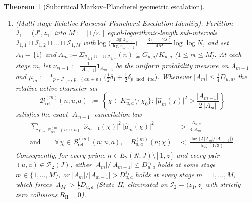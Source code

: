 \documentclass[11pt, a4paper]{article}
\theoremstyle{plain}
\newtheorem{theorem}{Theorem}[section]
\theoremstyle{definition}
\begin{document}
\begin{theorem}[Subcritical Markov--Plancherel geometric escalation]
\begin{enumerate}[label=(\alph*)]
    \item \emph{(Multi-stage Relative Parseval--Plancherel Escalation Identity).} 
    Partition $\mathcal{I}_1=(J^{5},z_1]$ into $M:=\lceil 1/\varepsilon_1\rceil$ equal-logarithmic-length sub-intervals $\mathcal{I}_{1,1}\sqcup\mathcal{I}_{1,2}\sqcup\dots\sqcup\mathcal{I}_{1,M}$ with\linebreak $\log\big(\frac{\log z_{1,m}}{\log z_{1,m-1}}\big)=\frac{3(1-2\lambda)}{4M}\log\log N$, and set $A_0=\{1\}$ and $A_m:=$\linebreak $\overline{\Sigma}_{\mathcal{I}_{1,1}\cup\dots\cup\mathcal{I}_{1,m}}(n)\subseteq G_{u,a}/K_{u,a}$ ($1\le m\le M$). At each stage $m$, let $\nu_{m-1}:=\frac{1}{|A_{m-1}|}\mathbf{1}_{A_{m-1}}$ be the uniform probability measure on $A_{m-1}$ and $\mu_m:=\ast_{p\in\mathcal{I}_{1,m},\,p\mid(an+u)}\big(\frac12\delta_1+\frac12\delta_{p\bmod 4ua}\big)$. Whenever $|A_m|\le\frac14 D_{u,a}$, the relative active character set
    \begin{equation}\label{eq:relative_active_char_set}
    \mathcal{B}_{\mathrm{rel}}^{(m)}(n;u,a)\ :=\ \left\{\chi\in K_{u,a}^{\perp}\setminus\{\chi_0\}:\ \big|\widehat{\mu}_m(\chi)\big|^{2}>\frac{|A_{m-1}|}{2\,|A_m|}\right\}
    \end{equation}
    satisfies the exact $|A_{m-1}|$-cancellation law
    \begin{equation}\label{eq:relative_parseval_plancherel_law}
    \begin{aligned}
    \sum_{\chi\in\mathcal{B}_{\mathrm{rel}}^{(m)}(n;u,a)}\big|\widehat{\nu}_{m-1}(\chi)\big|^{2}\,\big|\widehat{\mu}_m(\chi)\big|^{2}\ &>\ \frac{D_{u,a}}{4\,|A_m|}\\
    \text{and}\qquad\forall\,\chi\in\mathcal{B}_{\mathrm{rel}}^{(m)}(n;u,a),\quad R_{u,a}^{(m)}(n;\chi)\ &<\ \frac{\log\big(2\,|A_m|/|A_{m-1}|\big)}{\log(4/3)}.
    \end{aligned}
    \end{equation}
    Consequently, for every prime $n\in E_2(N;J)\setminus[1,z]$ and every pair $(u,a)\in\mathcal{P}_2(J)$, either $|A_m|/|A_{m-1}|\le D_{u,a}^{\varepsilon_1}$ holds at some stage $m\in\{1,\dots,M\}$, or $|A_m|/|A_{m-1}|>D_{u,a}^{\varepsilon_1}$ holds at every stage $m=1,\dots,M$, which forces $|A_M|>\frac14 D_{u,a}$ (State~II, eliminated on $\mathcal{I}_2=(z_1,z]$ with strictly zero collisions $R_{\mathrm{II}}=0$).
\end{enumerate}
\end{theorem}
\end{document}
